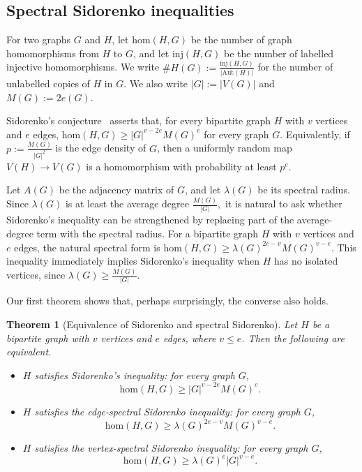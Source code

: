 \documentclass[10pt,a4paper]{amsart}
\newtheorem{theorem}{Theorem}[section]
\newcommand{\inj}{\mathrm{inj}}
\newcommand{\homc}{\mathrm{hom}}
\newcommand{\Aut}{\mathrm{Aut}}
\begin{document}
\subsection{Spectral Sidorenko inequalities}

For two graphs \(G\) and \(H\), let \(\homc(H,G)\) be the number of graph
homomorphisms from \(H\) to \(G\), and let \(\inj(H,G)\) be the number of
labelled injective homomorphisms.  We write  $\texttt{\#}H(G):=\frac{\inj(H,G)}{|\Aut(H)|}$
for the number of unlabelled copies of \(H\) in \(G\).  We also write $|G|:=|V(G)|$ and $M(G):=2e(G).$

Sidorenko's conjecture~\cite{Sidorenko1993CorrelationInequality}
asserts that, for every bipartite graph \(H\) with \(v\) vertices and
\(e\) edges,
$        \homc(H,G)\ge |G|^{v-2e} M(G)^e $
for every graph \(G\).  Equivalently, if
        $p:=\frac{M(G)}{|G|^2}$ is the edge density of \(G\), then a uniformly random map
\(V(H)\to V(G)\) is a homomorphism with probability at least \(p^e\).

Let \(A(G)\) be the adjacency matrix of \(G\), and let \(\lambda(G)\) be
its spectral radius.  Since
        $\lambda(G)$ is at least the average degree  $\frac{M(G)}{|G|},$
it is natural to ask whether Sidorenko's inequality can be strengthened
by replacing part of the average-degree term with  the spectral radius.  For
a bipartite graph \(H\) with \(v\) vertices and \(e\) edges, the natural
spectral form is
       $ \homc(H,G)\ge \lambda(G)^{2e-v}M(G)^{v-e}.$
This inequality immediately implies Sidorenko's
inequality when $H$ has no isolated vertices, since $\lambda(G)\ge \frac{M(G)}{|G|}$.

Our first theorem shows that, perhaps surprisingly, the converse also holds.

\begin{theorem}[Equivalence of Sidorenko and spectral Sidorenko]
\label{thm:equivalence}
Let \(H\) be a bipartite graph with \(v\) vertices and \(e\) edges, where
\(v\le e\).  Then the following are equivalent.
\begin{itemize}
    \item[\rm(i)]
    \(H\) satisfies Sidorenko's inequality: for every graph \(G\), 
    $$\homc(H,G)\ge |G|^{v-2e}M(G)^e.$$

    \item[\rm(ii)]
    \(H\) satisfies the edge-spectral Sidorenko inequality: for every graph \(G\), 
    \begin{equation}
\label{eq:spectral-sidorenko-general}
        \homc(H,G)\ge \lambda(G)^{2e-v}M(G)^{v-e}.
\end{equation}

\item[\rm (iii)]
$H$ satisfies the vertex-spectral Sidorenko inequality: for every graph $G$, 
\[  \homc (H,G)\ge \lambda(G)^e |G|^{v-e}. \] 
\end{itemize}
\end{theorem}
\end{document}
